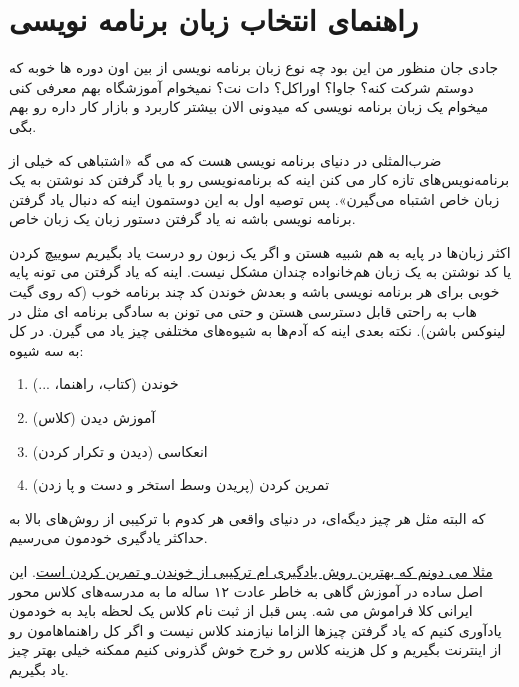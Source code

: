 \section{راهنمای انتخاب زبان برنامه نویسی}
\begin{mdframed}
جادی جان منظور من این بود چه نوع زبان برنامه نویسی از بین اون دوره ها خوبه که دوستم شرکت کنه؟ جاوا؟ اوراکل؟ دات نت؟ نمیخوام آموزشگاه بهم معرفی کنی میخوام یک زبان برنامه نویسی که میدونی الان بیشتر کاربرد و بازار کار داره رو بهم بگی.
\end{mdframed}
ضرب‌المثلی در دنیای برنامه نویسی هست که می گه «اشتباهی که خیلی از برنامه‌نویس‌های تازه کار می کنن اینه که برنامه‌نویسی رو با یاد گرفتن کد نوشتن به یک زبان خاص اشتباه می‌گیرن». پس توصیه اول به این دوستمون اینه که دنبال یاد گرفتن برنامه نویسی باشه نه یاد گرفتن دستور زبان یک زبان خاص.

 اکثر زبان‌ها در پایه به هم شبیه هستن و اگر یک زبون رو درست یاد بگیریم سوییچ کردن یا کد نوشتن به یک زبان هم‌خانواده چندان مشکل نیست. اینه که یاد گرفتن  می تونه پایه خوبی برای هر برنامه نویسی باشه و بعدش خوندن کد چند برنامه خوب (که روی گیت هاب به راحتی قابل دسترسی هستن و حتی می تونن به سادگی برنامه ای مثل  در لینوکس باشن).
نکته بعدی اینه که آدم‌ها به شیوه‌های مختلفی چیز یاد می گیرن. در کل به سه شیوه:
\begin{enumerate}
\item خوندن (کتاب، راهنما، ...)
\item آموزش دیدن (کلاس)
\item انعکاسی (دیدن و تکرار کردن)
\item تمرین کردن (پریدن وسط استخر و دست و پا زدن)
\end{enumerate}
که البته مثل هر چیز دیگه‌ای، در دنیای واقعی هر کدوم با ترکیبی از روش‌های بالا به حداکثر یادگیری خودمون می‌رسیم.

\href{http://jadi.net/2011/12/\%da\%86\%d8\%b7\%d9\%88\%d8\%b1\%db\%8c-\%d8\%a7\%d8\%b3\%da\%a9\%d8\%b1\%db\%8c\%d9\%be\%d8\%aa-\%d9\%86\%d9\%88\%db\%8c\%d8\%b3\%db\%8c-\%d8\%a8\%d8\%b4-\%db\%8c\%d8\%a7-\%d9\%87\%d8\%b1-\%da\%86\%db\%8c\%d8\%b2-\%d8\%af\%db\%8c\%da\%af\%d9\%87-\%db\%8c\%d8\%a7/" title="چطوری اسکریپت نویسی بش یا هر چیز دیگه یاد بگیریم؟}{مثلا می دونم که بهترین روش یادگیری ام ترکیبی از خوندن و تمرین کردن است}.
 این اصل ساده در آموزش گاهی به خاطر عادت ۱۲ ساله ما به مدرسه‌های کلاس محور ایرانی کلا فراموش می شه. پس قبل از ثبت نام کلاس یک لحظه باید به خودمون یادآوری کنیم که یاد گرفتن چیزها الزاما نیازمند کلاس نیست و اگر کل راهنماهامون رو از اینترنت بگیریم و کل هزینه کلاس رو خرج خوش گذرونی کنیم ممکنه خیلی بهتر چیز یاد بگیریم.

